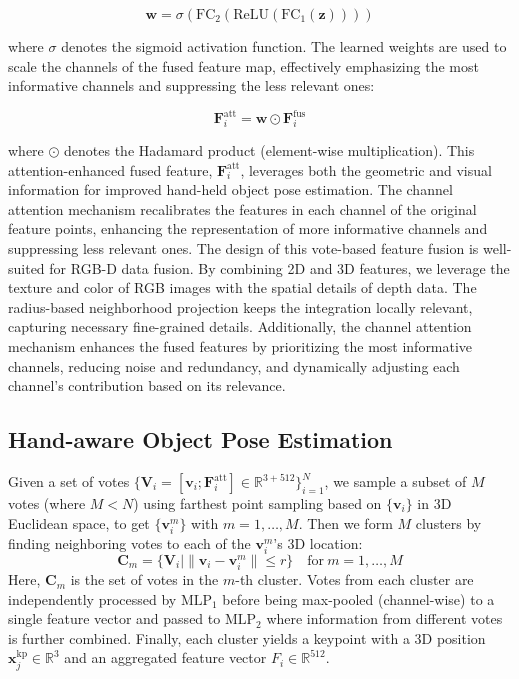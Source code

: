 \[
\mathbf{w} = \sigma(\text{FC}_2(\text{ReLU}(\text{FC}_1(\mathbf{z}))))
\]

\noindent where \(\sigma\) denotes the sigmoid activation function. The learned weights are used to scale the channels of the fused feature map, effectively emphasizing the most informative channels and suppressing the less relevant ones:

\[
\mathbf{F}_i^{\text{att}} = \mathbf{w} \odot \mathbf{F}_i^{\text{fus}}
\]

\noindent where \(\odot\) denotes the Hadamard product (element-wise multiplication). This attention-enhanced fused feature, \(\mathbf{F}_i^{\text{att}}\), leverages both the geometric and visual information for improved hand-held object pose estimation. The channel attention mechanism recalibrates the features in each channel of the original feature points, enhancing the representation of more informative channels and suppressing less relevant ones. The design of this vote-based feature fusion is well-suited for RGB-D data fusion. By combining 2D and 3D features, we leverage the texture and color of RGB images with the spatial details of depth data. The radius-based neighborhood projection keeps the integration locally relevant, capturing necessary fine-grained details. Additionally, the channel attention mechanism enhances the fused features by prioritizing the most informative channels, reducing noise and redundancy, and dynamically adjusting each channel's contribution based on its relevance.

\subsection{Hand-aware Object Pose Estimation}

Given a set of votes $\{\mathbf{V}_i = [\mathbf{v}_i; \mathbf{F}_i^{\text{att}}] \in \mathbb{R}^{3+512}\}_{i=1}^{N}$, we sample a subset of $M$ votes (where $M < N$) using farthest point sampling based on $\{\mathbf{v}_i\}$ in 3D Euclidean space, to get $\{\mathbf{v}_i^m\}$ with $m = 1, \ldots, M$. Then we form $M$ clusters by finding neighboring votes to each of the $\mathbf{v}_i^m$'s 3D location:
\[
\mathbf{C}_m = \{\mathbf{V}_i \mid \|\mathbf{v}_i - \mathbf{v}_i^m\| \leq r\} \quad \text{for} \ m = 1, \ldots, M
\]
Here, $\mathbf{C}_m$ is the set of votes in the $m$-th cluster. Votes from each cluster are independently processed by $\text{MLP}_1$ before being max-pooled (channel-wise) to a single feature vector and passed to $\text{MLP}_2$ where information from different votes is further combined. Finally, each cluster yields a keypoint with a 3D position $\mathbf{x}_{j}^{\text{kp}} \in \mathbb{R}^{3}$ and an aggregated feature vector $F_{i} \in \mathbb{R}^{512}$. 

